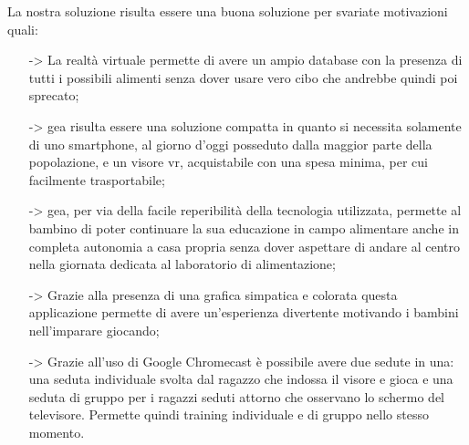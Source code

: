 La nostra soluzione risulta essere una buona soluzione per svariate motivazioni quali:
\begin{itemize}
\item[->] La realtà virtuale permette di avere un ampio database con la presenza di tutti i possibili alimenti senza dover usare vero cibo che andrebbe quindi poi sprecato;
\item[->] \acs{gea} risulta essere una soluzione compatta in quanto si necessita solamente di uno smartphone, al giorno d'oggi posseduto dalla maggior parte della popolazione, e un visore \acs{vr}, acquistabile con una spesa minima, per cui facilmente trasportabile;
\item[->] \acs{gea}, per via della facile reperibilità della tecnologia utilizzata, permette al bambino di poter continuare la sua educazione in campo alimentare anche in completa autonomia a casa propria senza dover aspettare di andare al centro nella giornata dedicata al laboratorio di alimentazione;
\item[->] Grazie alla presenza di una grafica simpatica e colorata questa applicazione permette di avere un'esperienza divertente motivando i bambini nell'imparare giocando;
\item[->] Grazie all'uso di Google Chromecast è possibile avere due sedute in una: una seduta individuale svolta dal ragazzo che indossa il visore e gioca e una seduta di gruppo per i ragazzi seduti attorno che osservano lo schermo del televisore. Permette quindi training individuale e di gruppo nello stesso momento.
\end{itemize}